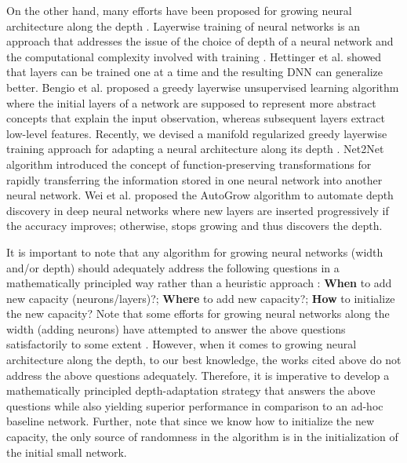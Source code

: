 On the other hand, many efforts have been proposed for growing neural architecture along the depth \cite{hettinger2017forward,kulkarni2017layer,wen2020autogrow}. Layerwise training of neural networks is an approach that addresses the issue of the choice of depth of a neural network and the computational complexity involved with training \cite{xu1999training}.   Hettinger et al. \cite{hettinger2017forward} showed that layers can be trained one at a time and the resulting DNN can generalize better. Bengio et al.  \cite{bengio2007greedy} proposed a greedy layerwise unsupervised learning algorithm where the initial layers of a network are supposed to represent more abstract concepts that explain the input observation, whereas subsequent layers extract low-level features. Recently, we devised a manifold regularized greedy layerwise training approach for adapting a neural architecture along its depth \cite{krishnanunni2022layerwise}. Net2Net algorithm \cite{chen2015net2net} introduced the concept of function-preserving transformations for rapidly transferring the information stored in one
neural network into another neural network. Wei et al. \cite{wen2020autogrow} proposed the AutoGrow algorithm to automate depth discovery in deep neural networks where new layers are inserted progressively
if the accuracy improves; otherwise, stops growing and
thus discovers the depth.






It is important to note that any algorithm for growing neural networks (width and/or depth) should adequately address the following questions in a mathematically principled way rather than a heuristic approach \cite{evci2022gradmax}: {\bf{When}} to add new capacity (neurons/layers)?; {\bf{Where}} to add new capacity?; {\bf{How}} to initialize the new capacity? 
Note that some efforts for growing neural networks along the width (adding neurons) have attempted to answer the above questions satisfactorily to some extent \cite{wu2019splitting,wu2020firefly,wynne1993node,evci2022gradmax,maile2022and}. However,  when it comes to growing neural architecture along the depth, to our best knowledge, the works cited above do not address the above questions adequately. Therefore, it is imperative to develop a mathematically principled depth-adaptation strategy that answers the above questions while also yielding superior performance in comparison to an ad-hoc baseline network. Further, note that since we know how to initialize the new capacity, the only source of randomness in the algorithm is in the initialization of the initial small network.